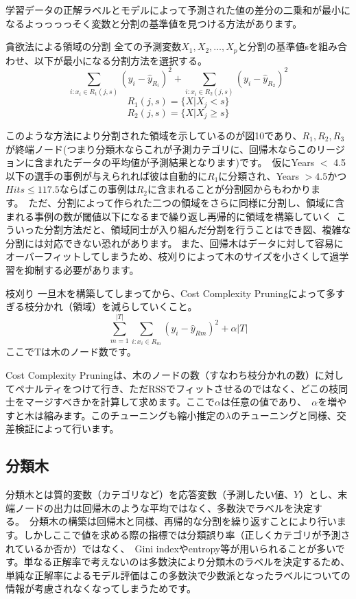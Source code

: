 \documentclass[uplatex]{jsarticle}
\begin{document}
学習データの正解ラベルとモデルによって予測された値の差分の二乗和が最小になるよっっっっそく変数と分割の基準値を見つける方法があります。
\begin{itembox}[l]{貪欲法による領域の分割}
  全ての予測変数$X_1, X_2, \dots, X_p$と分割の基準値sを組み合わせ、以下が最小になる分割方法を選択する。\
  $$\sum_{i:x_i \in R_1(j, s)} (y_i - \hat{y}_{R_i})^2 + \sum_{i:x_i \in R_2(j, s)} (y_i - \hat{y}_{R_2})^2$$
  $$ R_1(j, s) = \{X|X_j < s\}$$
  $$ R_2(j, s) = \{X|X_j \geq s\}$$
\end{itembox}
このような方法により分割された領域を示しているのが図10であり、$R_1, R_2, R_3$が終端ノード(つまり分類木ならこれが予測カテゴリに、回帰木ならこのリージョンに含まれたデータの平均値が予測結果となります)です。\
仮にYears $<$ 4.5以下の選手の事例が与えられれば彼は自動的に$R_1$に分類され、Years $> 4.5$かつ$Hits \leq 117.5$ならばこの事例は$R_2$に含まれることが分割図からもわかります。\
ただ、分割によって作られた二つの領域をさらに同様に分割し、領域に含まれる事例の数が閾値以下になるまで繰り返し再帰的に領域を構築していく\
こういった分割方法だと、領域同士が入り組んだ分割を行うことはでき図、複雑な分割には対応できない恐れがあります。
また、回帰木はデータに対して容易にオーバーフィットしてしまうため、枝刈りによって木のサイズを小さくして過学習を抑制する必要があります。
\begin{itembox}[l]{枝刈り}
  一旦木を構築してしまってから、Cost Complexity Pruningによって多すぎる枝分かれ（領域）を減らしていくこと。\
  $$\sum_{m=1}^{|T|}\sum_{i:x_i \in R_m} (y_i - \hat{y}_{Rm})^2 + \alpha|T|$$
  ここでTは木のノード数です。
\end{itembox}
Cost Complexity Pruningは、木のノードの数（すなわち枝分かれの数）に対してペナルティをつけて行き、ただ{\rm RSS}でフィットさせるのではなく、どこの枝同士をマージすべきかを計算して求めます。ここで$\alpha$は任意の値であり、\
$\alpha$を増やすと木は縮みます。このチューニングも縮小推定の$\lambda$のチューニングと同様、交差検証によって行います。\

\subsection{分類木}
分類木とは質的変数（カテゴリなど）を応答変数（予測したい値、$Y$）とし、末端ノードの出力は回帰木のような平均ではなく、多数決でラベルを決定する。\
分類木の構築は回帰木と同様、再帰的な分割を繰り返すことにより行います。しかしここで値を求める際の指標では分類誤り率（正しくカテゴリが予測されているか否か）ではなく、\
Gini indexやentropy等が用いられることが多いです。単なる正解率で考えないのは多数決により分類木のラベルを決定するため、単純な正解率によるモデル評価はこの多数決で少数派となったラベルについての情報が考慮されなくなってしまうためです。
\end{document}
